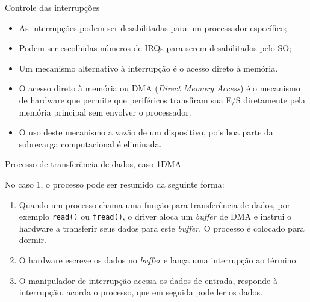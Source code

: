 \begin{frame}{Controle das interrupções}

  \begin{itemize}
  \item<1-> As interrupções podem ser desabilitadas para um processador 
    específico;
  \item<2-> Podem ser escolhidas números de IRQs para serem desabilitados 
    pelo SO;
  \item<3> Um mecanismo alternativo à interrupção é o acesso direto à
    memória.
  \end{itemize}
  
\end{frame}


\begin{frame}{\insertlecture}

  \begin{itemize}
  \item<1-> O acesso direto à memória ou DMA ({\it Direct Memory Access})
    é o mecanismo de hardware que permite que periféricos transfiram
    sua E/S diretamente pela memória principal sem envolver o
    processador.
  \item<2-> O uso deste mecanismo a vazão de um dispositivo, pois boa parte 
    da sobrecarga computacional é eliminada.
  \end{itemize}

\end{frame}

\begin{frame}{Processo de transferência de dados, caso 1}{DMA}
  
  No caso 1, o processo pode ser resumido da seguinte forma:
  \begin{enumerate}
  \item<1-> Quando um processo chama uma função para transferência de
    dados, por exemplo {\tt read()} ou {\tt fread()}, o driver aloca
    um {\it buffer} de DMA e instrui o hardware a transferir seus
    dados para este {\it buffer}. O processo é colocado para dormir.
  \item<2-> O hardware escreve os dados no {\it buffer} e lança uma
    interrupção ao término.
  \item<3-> O manipulador de interrupção acessa os dados de entrada,
    responde à interrupção, acorda o processo, que em seguida pode ler
    os dados.
  \end{enumerate}

\end{frame}

